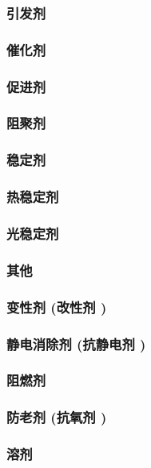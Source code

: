 \documentclass[UTF8]{../../ApplicationUniverse}
\begin{document}
                \subsubsection{引发剂}
                \subsubsection{催化剂}
                \subsubsection{促进剂}
                \subsubsection{阻聚剂}
                \subsubsection{稳定剂}
                \subsubsection{热稳定剂}
                \subsubsection{光稳定剂}
                \subsubsection{其他}
                \subsubsection{变性剂 (改性剂 )}
                \subsubsection{静电消除剂 (抗静电剂 )}
                \subsubsection{阻燃剂}
                \subsubsection{防老剂 (抗氧剂 )}
                \subsubsection{溶剂}
\end{document}
